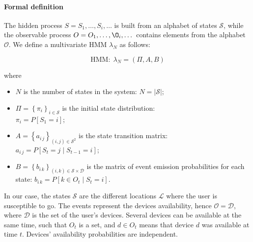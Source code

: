 \paragraph*{Formal definition} 

The hidden process $S=S_1,\dots,S_i, \dots$ is built from an alphabet of states $\mathcal{S}$, while the observable process $O=O_1, \dots, \O_i, \dots$ contains elements from the alphabet $\mathcal{O}$. We define a multivariate HMM $\lambda_N$ as follows:

$$\text{HMM}:\;\lambda_N=(\Pi, A, B)$$

where 
\begin{itemize}
	\item $N$ is the number of states in the system:
	$N = \left| \mathcal{S} \right|$;

	\item $\Pi=\left\{ \pi_i\right\}_{i\in\mathcal{S}}$ is the initial state distribution:\\
	$\pi_i=P[S_1=i]$;

	\item $A = \left\{ a_{i\,j}\right\}_{(i,j)\in\mathcal{S}^2}$ is the state transition matrix:\\
	$a_{i\,j}=P[S_t=j \mid S_{t-1}=i]$;

	\item $B = \left\{ b_{i\,k}\right\}_{(i,k)\in\mathcal{S}\times\mathcal{D}}$ is the matrix of event emission probabilities for each state:
	$b_{i\,k} = P[ k \in O_t \mid S_t = i]$.
\end{itemize}

In our case, the states $\mathcal{S}$ are the different locations $\mathcal{L}$ where the user is susceptible to go.
The events represent the devices availability, hence $\mathcal{O} = \mathcal{D}$, where $\mathcal{D}$ is the set of the user's devices.
Several devices can be available at the same time, such that $O_t$ is a set, and $d \in O_t$ means that device $d$ was available at time $t$. Devices' availability probabilities are independent.



